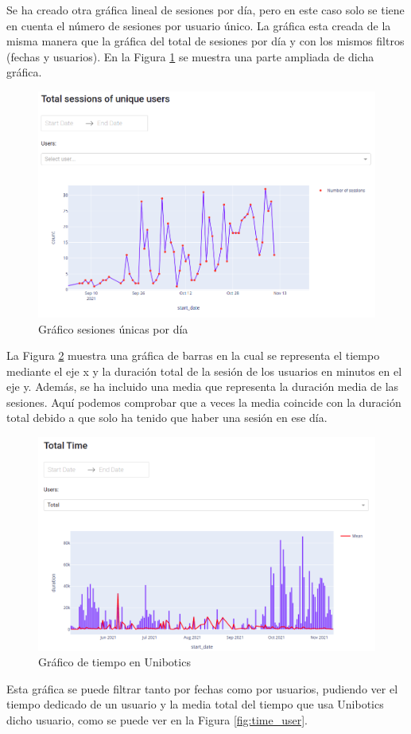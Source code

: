 Se ha creado otra gráfica lineal de sesiones por día, pero en este caso solo se tiene en cuenta el número de sesiones por usuario único. La gráfica esta creada de la misma manera que la gráfica del total de sesiones por día y con los mismos filtros (fechas y usuarios). En la Figura \ref{fig:sesion_users}  se muestra una parte ampliada de dicha gráfica.\\

\begin{figure}[H]
    \centering
    \includegraphics[width=18cm, keepaspectratio]{img/sesion_users.png}
    \caption{Gráfico sesiones únicas por día}
    \label{fig:sesion_users}
\end{figure}
\newpage
La Figura \ref{fig:time} muestra una gráfica de barras en la cual se representa el tiempo mediante el eje x y la duración total de la sesión de los usuarios en minutos en el eje y. Además, se ha incluido una media que representa la duración media de las sesiones. Aquí podemos comprobar que a veces la media coincide con la duración total debido a que solo ha tenido que haber una sesión en ese día.



\begin{figure}[H]
    \centering
    \includegraphics[width=18cm, keepaspectratio]{img/time.png}
    \caption{Gráfico de tiempo en Unibotics}
    \label{fig:time}
\end{figure}
Esta gráfica se puede filtrar tanto por fechas como por usuarios, pudiendo ver el tiempo dedicado de un usuario y la media total del tiempo que usa Unibotics dicho usuario, como se puede ver en la Figura \ref{fig:time_user}.

